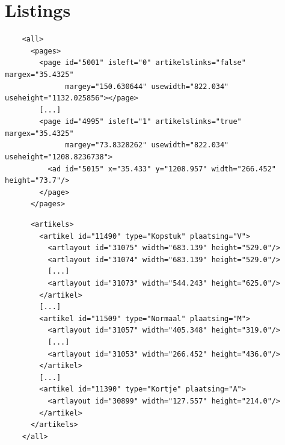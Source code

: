 \documentclass[a4paper,12pt]{report}
\begin{document}
\appendix

\chapter{Listings}

\begin{listing}
	\begin{verbatim}
	<all>
	  <pages>
	    <page id="5001" isleft="0" artikelslinks="false" margex="35.4325" 
	          margey="150.630644" usewidth="822.034" useheight="1132.025856"></page>
	    [...]
	    <page id="4995" isleft="1" artikelslinks="true" margex="35.4325" 
	          margey="73.8328262" usewidth="822.034" useheight="1208.8236738">
	      <ad id="5015" x="35.433" y="1208.957" width="266.452"  height="73.7"/>
	    </page>
	  </pages>
	\end{verbatim}
  \caption{Invoer XML bestand}
  \label{listing:inXML}
\end{listing}

\begin{listing}
	\begin{verbatim}
	  <artikels>
	    <artikel id="11490" type="Kopstuk" plaatsing="V">
	      <artlayout id="31075" width="683.139" height="529.0"/>
	      <artlayout id="31074" width="683.139" height="529.0"/>
	      [...]
	      <artlayout id="31073" width="544.243" height="625.0"/>
	    </artikel>
	    [...]
	    <artikel id="11509" type="Normaal" plaatsing="M">
	      <artlayout id="31057" width="405.348" height="319.0"/>
	      [...]
	      <artlayout id="31053" width="266.452" height="436.0"/>
	    </artikel>
	    [...]
	    <artikel id="11390" type="Kortje" plaatsing="A">
	      <artlayout id="30899" width="127.557" height="214.0"/>
	    </artikel>
	  </artikels>
	</all>
	\end{verbatim}
  \caption{Invoer XML bestand (vervolg)}
  \label{listing:inXML2}
\end{listing}

	
\end{document}
